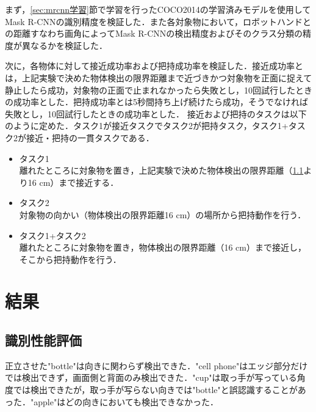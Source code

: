 まず，\ref{sec:mrcnn学習}節で学習を行ったCOCO2014の学習済みモデルを使用してMask R-CNNの識別精度を検証した．また各対象物において，ロボットハンドとの距離すなわち画角によってMask R-CNNの検出精度およびそのクラス分類の精度が異なるかを検証した．

次に，各物体に対して接近成功率および把持成功率を検証した．接近成功率とは，上記実験で決めた物体検出の限界距離まで近づきかつ対象物を正面に捉えて静止したら成功，対象物の正面で止まれなかったら失敗とし，10回試行したときの成功率とした．把持成功率とは5秒間持ち上げ続けたら成功，そうでなければ失敗とし，10回試行したときの成功率とした．
接近および把持のタスクは以下のように定めた．タスク1が接近タスクでタスク2が把持タスク，タスク1+タスク2が接近・把持の一貫タスクである．
\begin{itemize}
    \item タスク1\\
    離れたところに対象物を置き，上記実験で決めた物体検出の限界距離（\ref{sec:識別性能評価}より16 cm）まで接近する．
    \item タスク2\\
    対象物の向かい（物体検出の限界距離16 cm）の場所から把持動作を行う．
    \item タスク1+タスク2\\
    離れたところに対象物を置き，物体検出の限界距離（16 cm）まで接近し，そこから把持動作を行う．
\end{itemize}


\section{結果}
\subsection{識別性能評価}\label{sec:識別性能評価}
正立させた"bottle"は向きに関わらず検出できた．"cell phone"はエッジ部分だけでは検出できず，画面側と背面のみ検出できた．"cup"は取っ手が写っている角度では検出できたが，取っ手が写らない向きでは"bottle"と誤認識することがあった．"apple"はどの向きにおいても検出できなかった．

